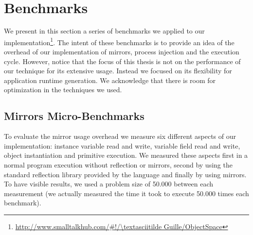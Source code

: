 %

\section{Benchmarks}

We present in this section a series of benchmarks we applied to our implementation\footnote{\url{http://www.smalltalkhub.com/\#!/\textasciitilde Guille/ObjectSpace}}. The intent of these benchmarks is to provide an idea of the overhead of our implementation of mirrors, process injection and the execution cycle. However, notice that the focus of this thesis is not on the performance of our technique for its extensive usage. Instead we focused on its flexibility for application runtime generation. We acknowledge that there is room for optimization in the techniques we used.

\subsection{Mirrors Micro-Benchmarks}

To evaluate the mirror usage overhead we measure six different aspects of our implementation: instance variable read and write, variable field read and write, object instantiation and primitive execution. We measured these aspects first in a normal program execution without reflection or mirrors, second by using the standard reflection library provided by the language and finally by using mirrors. To have visible results, we used a problem size of 50.000 between each measurement (\ie we actually measured the time it took to execute 50.000 times each benchmark).

